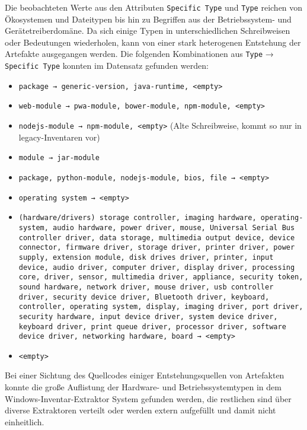 Die beobachteten Werte aus den Attributen \texttt{Specific Type} und \texttt{Type} reichen von Ökosystemen und Dateitypen bis hin zu Begriffen aus der Betriebssystem- und Gerätetreiberdomäne.
Da sich einige Typen in unterschiedlichen Schreibweisen oder Bedeutungen wiederholen, kann von einer stark heterogenen Entstehung der Artefakte ausgegangen werden.
Die folgenden Kombinationen aus \texttt{Type} → \texttt{Specific Type} konnten im Datensatz gefunden werden:

\begin{itemize}
    \itemsep0em

    \item \texttt{package → generic-version, java-runtime, <empty>}
    \item \texttt{web-module → pwa-module, bower-module, npm-module, <empty>}
    \item \texttt{nodejs-module → npm-module, <empty>} (Alte Schreibweise, kommt so nur in legacy-Inventaren vor)
    \item \texttt{module → jar-module}
    \item \texttt{package, python-module, nodejs-module, bios, file → <empty>}
    \item \texttt{operating system → <empty>}
    \item \texttt{(hardware/drivers) storage controller, imaging hardware, operating-system, audio hardware, power driver, mouse, Universal Serial Bus controller driver, data storage, multimedia output device, device connector, firmware driver, storage driver, printer driver, power supply, extension module, disk drives driver, printer, input device, audio driver, computer driver, display driver, processing core, driver, sensor, multimedia driver, appliance, security token, sound hardware, network driver, mouse driver, usb controller driver, security device driver, Bluetooth driver, keyboard, controller, operating system, display, imaging driver, port driver, security hardware, input device driver, system device driver, keyboard driver, print queue driver, processor driver, software device driver, networking hardware, board → <empty>}
    \item \texttt{<empty>}
\end{itemize}

Bei einer Sichtung des Quellcodes einiger Entstehungsquellen von Artefakten konnte die große Auflistung der Hardware- und Betriebssystemtypen in dem Windows-Inventar-Extraktor System gefunden werden, die restlichen sind über diverse Extraktoren verteilt oder werden extern aufgefüllt und damit nicht einheitlich.

